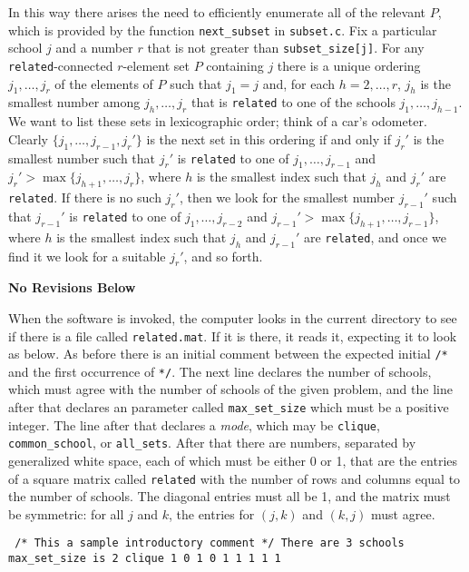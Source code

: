 \documentclass[12pt]{article}
\theoremstyle{definition}
\newcommand{\norev}{\medskip \centerline{\textbf{No Revisions Below}} \medskip}
\begin{document}
In this way there arises the need to efficiently enumerate all of the
relevant $P$, which is provided by the function \texttt{next\_subset}
in \texttt{subset.c}.  Fix a particular school $j$ and a number $r$
that is not greater than \texttt{subset\_size[j]}.  For any
\texttt{related}-connected $r$-element set $P$ containing $j$ there is
a unique ordering $j_1, \ldots, j_r$ of the elements of $P$ such that
$j_1 = j$ and, for each $h = 2, \ldots, r$, $j_h$ is the smallest
number among $j_h, \ldots, j_r$ that is \texttt{related} to one of the
schools $j_1, \ldots, j_{h-1}$.  We want to list these sets in
lexicographic order; think of a car's odometer.  Clearly $\{j_1,
\ldots, j_{r-1},j_r'\}$ is the next set in this ordering if and only
if $j_r'$ is the smallest number such that $j_r'$ is \texttt{related}
to one of $j_1, \ldots, j_{r-1}$ and $j_r' > \max \{j_{h+1}, \ldots,
j_r\}$, where $h$ is the smallest index such that $j_h$ and $j_r'$ are
\texttt{related}.  If there is no such $j_r'$, then we look for the
smallest number $j_{r-1}'$ such that $j_{r-1}'$ is \texttt{related} to
one of $j_1, \ldots, j_{r-2}$ and $j_{r-1}' > \max \{j_{h+1}, \ldots,
j_{r-1}\}$, where $h$ is the smallest index such that $j_h$ and
$j_{r-1}'$ are \texttt{related}, and once we find it we look for a
suitable $j_r'$, and so forth.



\norev

When the software is invoked, the computer looks in the current
directory to see if there is a file called \texttt{related.mat}.  If
it is there, it reads it, expecting it to look as below.  As before
there is an initial comment between the expected initial \texttt{/*}
and the first occurrence of \texttt{*/}.  The next line declares the
number of schools, which must agree with the number of schools of the
given problem, and the line after that declares an parameter called
\texttt{max\_set\_size} which must be a positive integer.  The line
after that declares a \emph{mode}, which may be \texttt{clique},
\texttt{common\_school}, or \texttt{all\_sets}.  After that there are
numbers, separated by generalized white space, each of which must be
either 0 or 1, that are the entries of a square matrix called
\texttt{related} with the number of rows and columns equal to the
number of schools.  The diagonal entries must all be 1, and the matrix
must be symmetric: for all $j$ and $k$, the entries for $(j,k)$ and
$(k,j)$ must agree.
\begin{obeylines}\texttt{
/* This a sample introductory comment */
There are 3 schools
max\_set\_size is 2
clique
1 0 1
0 1 1
1 1 1
}
\end{obeylines} \noindent
\end{document}
